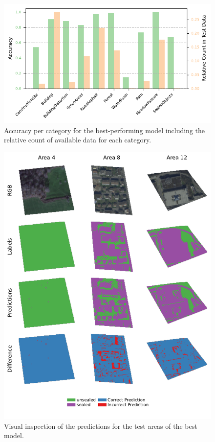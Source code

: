 \begin{figure}[H]
    \centering
    \captionsetup{width=0.8\linewidth}
    \includegraphics{figures/best_model_accuracy_per_category.pdf}
    \caption{Accuracy per category for the best-performing model including the relative count of available data for each category.}
    \label{fig:best_model_accuracy_per_category}
\end{figure}

\begin{figure}[H]
    \centering
    \captionsetup{width=0.8\linewidth}
    \includegraphics{figures/best_model_visual.pdf}
    \caption{Visual inspection of the predictions for the test areas of the best model.}
    \label{fig:best_model_visual}
\end{figure}
